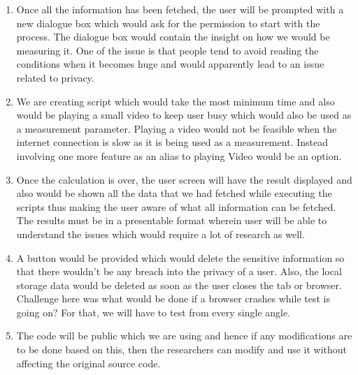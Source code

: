 \documentclass[journal]{IEEEtran}
\begin{document}
\begin{enumerate}
\item Once all the information has been fetched, the user will be prompted with a new dialogue box which would ask for the permission to start with the process. The dialogue box would contain the insight on how we would be measuring it. One of the issue is that people tend to avoid reading the conditions when it becomes huge and would apparently lead to an issue related to privacy.
\item We are creating script which would take the most minimum time and also would be playing a small video to keep user busy which would also be used as a measurement parameter. Playing a video would not be feasible when the internet connection is slow as it is being used as a measurement. Instead involving one more feature as an alias to playing Video would be an option.
\item Once the calculation is over, the user screen will have the result displayed and also would be shown all the data that we had fetched while executing the scripts thus making the user aware of what all information can be fetched. The results must be in a presentable format wherein user will be able to understand the issues which would require a lot of research as well. 
\item A button would be provided which would delete the sensitive information so that there wouldn't be any breach into the privacy of a user. Also, the local storage data would be deleted as soon as the user closes the tab or browser. Challenge here was what would be done if a browser crashes while test is going on? For that, we will have to test from every single angle.  
\item The code will be public which we are using and hence if any modifications are to be done based on this, then the researchers can modify and use it without affecting the original source code. 
\end{enumerate}
\end{document}

